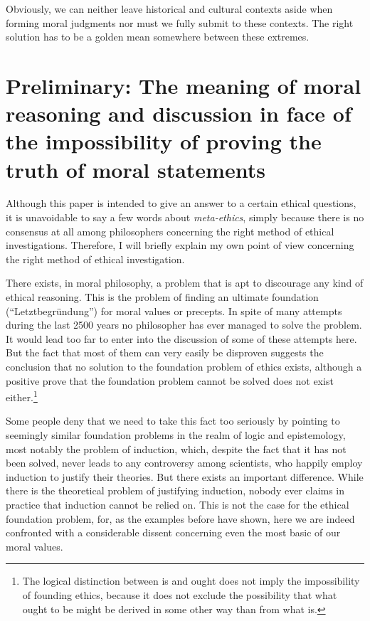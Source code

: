 \documentclass[12pt,a4paper,ngerman]{article}
\begin{document}
Obviously, we can neither leave historical and cultural contexts
aside when forming moral judgments nor must we fully submit to these
contexts. The right solution has to be a golden mean somewhere
 between these extremes. 


\section{Preliminary: The meaning of moral reasoning and discussion in
 face of the impossibility of proving the truth of moral statements}

Although this paper is intended to give an answer to a certain ethical
questions, it is unavoidable to say a few words about {\em meta-ethics},
simply because there is no consensus at all among philosophers
concerning the right method of ethical investigations. Therefore, I will
briefly explain my own point of view concerning the right method of
ethical investigation. 

There exists, in moral philosophy, a problem that is apt to discourage any
kind of ethical reasoning. This is the problem of finding an ultimate
foundation (``Letztbegr\"undung'') for moral values or precepts. In spite of
many attempts during the last 2500 years no philosopher has ever managed to
solve the problem. It would lead too far to enter into the discussion of some
of these attempts here. But the fact that most of them can very easily be
disproven suggests the conclusion that no solution to the foundation problem
of ethics exists, although a positive prove that the foundation problem cannot
be solved does not exist either.\footnote{The logical distinction between is
  and ought does not imply the impossibility of founding ethics, because it
  does not exclude the possibility that what ought to be might be derived in
  some other way than from what is.}

Some people deny that we need to take this fact too seriously by pointing to
seemingly similar foundation problems in the realm of logic and epistemology,
most notably the problem of induction, which, despite the fact that it has not
been solved, never leads to any controversy among scientists, who happily
employ induction to justify their theories. But there
exists an important difference. While there is the theoretical problem of
justifying induction, nobody ever claims in practice that induction cannot be
relied on. This is not the case for the ethical foundation problem, for, as
the examples before have shown, here we are indeed confronted with a
considerable dissent concerning even the most basic of our moral values.
\end{document}
